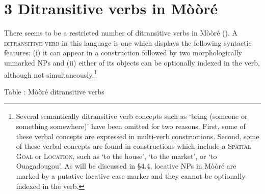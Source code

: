 \documentclass[output=paper]{langsci/langscibook}
\begin{document}
\chapter{3 Ditransitive verbs in M\`{o}\`{o}r\'{e}}

There seems to be a restricted number of ditransitive verbs in M\`{o}\`{o}r\'{e} (). A \textsc{ditransitive verb} in this language is one which displays the following syntactic features: (i) it can appear in a construction followed by two morphologically unmarked NPs and (ii) either of its objects can be optionally indexed in the verb, although not simultaneously.\footnote{ {Several semantically ditransitive verb concepts such as ‘bring (someone or something somewhere)’ have been omitted for two reasons. First, some of these verbal concepts are expressed in multi-verb constructions. Second, some of these verbal concepts are found in constructions which include a }{\textsc{Spatial}}{ }{\textsc{Goal}}{ or }{\textsc{Location}}{, such as ‘to the house’, ‘to the market’, or ‘to Ouagadougou’. As will be discussed in §4.4, locative NPs in M\`{o}\`{o}r\'{e} are marked by a putative locative case marker and they cannot be optionally indexed in the verb.} }{ }

\begin{styleTabellenberschrift}
\label{bkm:Ref446635932}Table : M\`{o}\`{o}r\'{e} ditransitive verbs
\end{styleTabellenberschrift}
\end{document}
